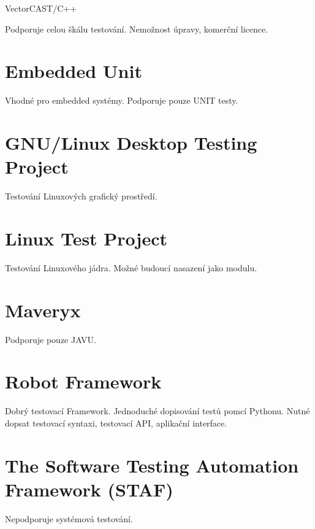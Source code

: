 VectorCAST/C++


Podporuje celou škálu testování.
Nemožnost úpravy, komerční licence.



\section{Embedded Unit}
Vhodné pro embedded systémy.
Podporuje pouze UNIT testy.



\section{GNU/Linux Desktop Testing Project}
Testování Linuxových grafický prostředí.

\section{Linux Test Project}
Testování Linuxového jádra.
Možné budoucí nasazení jako modulu.


\section{Maveryx}
Podporuje pouze JAVU.


\section{Robot Framework}
Dobrý testovací Framework.
Jednoduché dopisování testů pomcí Pythonu.
Nutné dopsat testovací syntaxi, testovací API, aplikační interface.


\section{The Software Testing Automation Framework (STAF)}
Nepodporuje systémová testování.






\endinput
